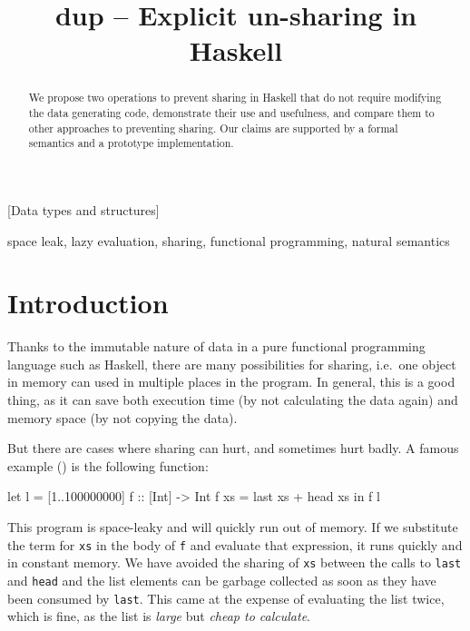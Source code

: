\documentclass[preprint]{sigplanconf}
\title{dup -- Explicit un-sharing in Haskell}
\theoremstyle{nonumberplain}
\newcommand{\li}{\lstinline[style=Haskell]}
\begin{document}
\maketitle

\begin{abstract}
We propose two operations to prevent sharing in Haskell that do not require modifying the data generating code, demonstrate their use and usefulness, and compare them to other approaches to preventing sharing. Our claims are supported by a formal semantics and a prototype implementation.
\end{abstract}


[Data types and structures]

\keywords space leak, lazy evaluation, sharing, functional programming, natural semantics


\section{Introduction}

Thanks to the immutable nature of data in a pure functional programming language such as Haskell, there are many possibilities for sharing, i.e.\ one object in memory can used in multiple places in the program. In general, this is a good thing, as it can save both execution time (by not calculating the data again) and memory space (by not copying the data).

But there are cases where sharing can hurt, and sometimes hurt badly. A famous example (\citep{wikibook,lazy-evaluators}) is the following function:
\begin{haskell}
let l = [1..100000000]
    f :: [Int] -> Int
    f xs = last xs + head xs
in  f l
\end{haskell}
This program is space-leaky and will quickly run out of memory. If we substitute the term for \li-xs- in the body of \li-f- and evaluate that expression, it runs quickly and in constant memory. We have avoided the sharing of \li-xs- between the calls to \li-last- and \li-head- and the list elements can be garbage collected as soon as they have been consumed by \li-last-. This came at the expense of evaluating the list twice, which is fine, as the list is \emph{large} but \emph{cheap to calculate}.
\end{document}
